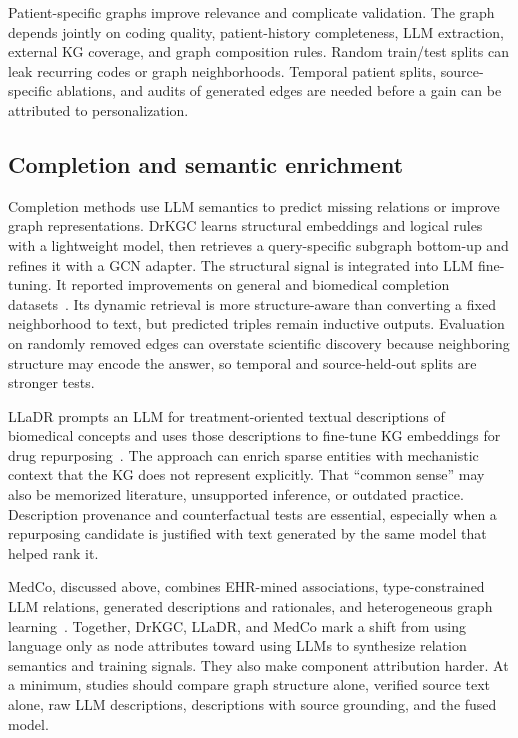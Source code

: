 Patient-specific graphs improve relevance and complicate validation. The graph depends jointly on coding quality, patient-history completeness, LLM extraction, external KG coverage, and graph composition rules. Random train/test splits can leak recurring codes or graph neighborhoods. Temporal patient splits, source-specific ablations, and audits of generated edges are needed before a gain can be attributed to personalization.

\subsection{Completion and semantic enrichment}

Completion methods use LLM semantics to predict missing relations or improve graph representations. DrKGC learns structural embeddings and logical rules with a lightweight model, then retrieves a query-specific subgraph bottom-up and refines it with a GCN adapter. The structural signal is integrated into LLM fine-tuning. It reported improvements on general and biomedical completion datasets~\cite{xiao2025drkgc}. Its dynamic retrieval is more structure-aware than converting a fixed neighborhood to text, but predicted triples remain inductive outputs. Evaluation on randomly removed edges can overstate scientific discovery because neighboring structure may encode the answer, so temporal and source-held-out splits are stronger tests.

LLaDR prompts an LLM for treatment-oriented textual descriptions of biomedical concepts and uses those descriptions to fine-tune KG embeddings for drug repurposing~\cite{xiang2025lladr}. The approach can enrich sparse entities with mechanistic context that the KG does not represent explicitly. That ``common sense'' may also be memorized literature, unsupported inference, or outdated practice. Description provenance and counterfactual tests are essential, especially when a repurposing candidate is justified with text generated by the same model that helped rank it.

MedCo, discussed above, combines EHR-mined associations, type-constrained LLM relations, generated descriptions and rationales, and heterogeneous graph learning~\cite{kerdabadi2026medco}. Together, DrKGC, LLaDR, and MedCo mark a shift from using language only as node attributes toward using LLMs to synthesize relation semantics and training signals. They also make component attribution harder. At a minimum, studies should compare graph structure alone, verified source text alone, raw LLM descriptions, descriptions with source grounding, and the fused model.

